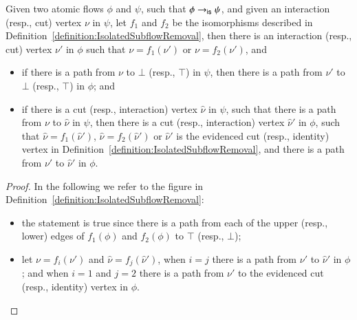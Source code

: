 \begin{lemma}\label{lemma:IsolatedSubflowRemovalPaths}
Given two atomic flows $\phi$ and $\psi$, such that $\phi\to_{\mathsf{is}}\psi$, and given an interaction (resp., cut) vertex $\nu$ in $\psi$, let $f_1$ and $f_2$ be the isomorphisms described in Definition~\ref{definition:IsolatedSubflowRemoval}, then there is an interaction (resp., cut) vertex $\nu'$ in $\phi$ such that $\nu=f_1(\nu')$ or $\nu=f_2(\nu')$, and
\begin{itemize}
\item if there is a path from $\nu$ to $\bot$ (resp., $\top$) in $\psi$, then there is a path from $\nu'$ to $\bot$ (resp., $\top$) in $\phi$; and
\item if there is a cut (resp., interaction) vertex $\hat\nu$ in $\psi$, such that there is a path from $\nu$ to $\hat\nu$ in $\psi$, then there is a cut (resp., interaction) vertex $\hat\nu'$ in $\phi$, such that $\hat\nu=f_1(\hat\nu')$, $\hat\nu=f_2(\hat\nu')$ or $\hat\nu'$ is the evidenced cut (resp., identity) vertex in Definition~\ref{definition:IsolatedSubflowRemoval}, and there is a path from $\nu'$ to $\hat\nu'$ in $\phi$.
\end{itemize}
\end{lemma}

\begin{proof}
In the following we refer to the figure in Definition~\ref{definition:IsolatedSubflowRemoval}:
\begin{itemize}
 \item the statement is true since there is a path from each of the upper (resp., lower) edges of $f_1(\phi)$ and $f_2(\phi)$ to $\top$ (resp., $\bot$);
 \item let $\nu=f_i(\nu')$ and $\hat\nu=f_j(\hat\nu')$, when $i=j$ there is a path from $\nu'$ to $\hat\nu'$ in $\phi$; and when $i=1$ and $j=2$ there is a path from $\nu'$ to the evidenced cut (resp., identity) vertex in $\phi$.
\end{itemize}
\end{proof}

